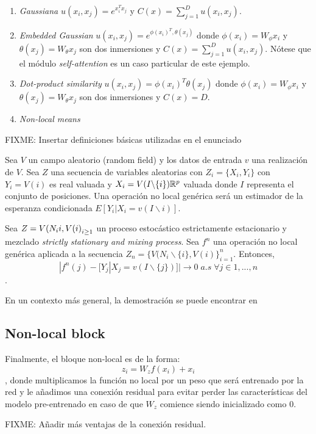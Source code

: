 \begin{enumerate}
\item \emph{Gaussiana} $u(x_i,x_j)=e^{x_i^T x_j}$ y $C(x)= \sum_{j=1}^D u(x_i,x_j)$.
\item \emph{Embedded Gaussian} $u(x_i,x_j)=e^{\phi(x_i)^T,\theta(x_j)}$ donde $\phi(x_i)=W_\phi x_i$ y $\theta(x_j)=W_\theta x_j$ son dos inmersiones y  $C(x)= \sum_{j=1}^D u(x_i,x_j)$. Nótese que el módulo \emph{self-attention} es un caso particular de este ejemplo.
\item \emph{Dot-product similarity} $u(x_i,x_j)=\phi(x_i)^T \theta(x_j)$ donde $\phi(x_i)=W_\phi x_i$ y $\theta(x_j)=W_\theta x_j$ son dos inmersiones y $C(x)=D$.
\item \emph{Non-local means} \cite{}
\end{enumerate}

FIXME: Insertar definiciones básicas utilizadas en el enunciado

Sea $V$ un campo aleatorio (random field) y los datos de entrada $v$ una realización de $V$. Sea $Z$ una secuencia de variables aleatorias con $Z_i=\{X_i,Y_i\}$ con $Y_i=V(i)$ es real valuada y $X_i=V(I\backslash \{i\}) \mathbb{R}^p$ valuada donde $I$ representa el conjunto de posiciones. Una operación no local genérica será un estimador de la esperanza condicionada $E[Y_i|X_i=v(I\backslash{i})]$.

\begin{teorema}
Sea $Z={V(N_i\newline{i},V(i)}_{i\ge 1}$ un proceso estocástico estrictamente estacionario y mezclado \emph{strictly stationary and mixing process}. Sea $f^n$ una operación no local genérica aplicada a la secuencia $Z_n=\{V(N_i\backslash\{i\},V(i)\}_{i=1}^n$. Entonces, $$ |f^n(j)-[Y_j|X_j=v(I\backslash \{j\})]| \to 0 \; a.s \;  \forall j \in{1,...,n}$$.
\end{teorema}

En un contexto más general, la demostración se puede encontrar en \cite{A non local algorithm for image denoising}


\subsection{Non-local block}
Finalmente, el bloque non-local es de la forma: $$z_i=W_z f(x_i) + x_i$$, donde multiplicamos la función no local por un peso que será entrenado por la red y le añadimos una conexión residual para evitar perder las características del modelo pre-entrenado en caso de que $W_z$ comience siendo inicializado como $0$.

FIXME: Añadir más ventajas de la conexión residual.
